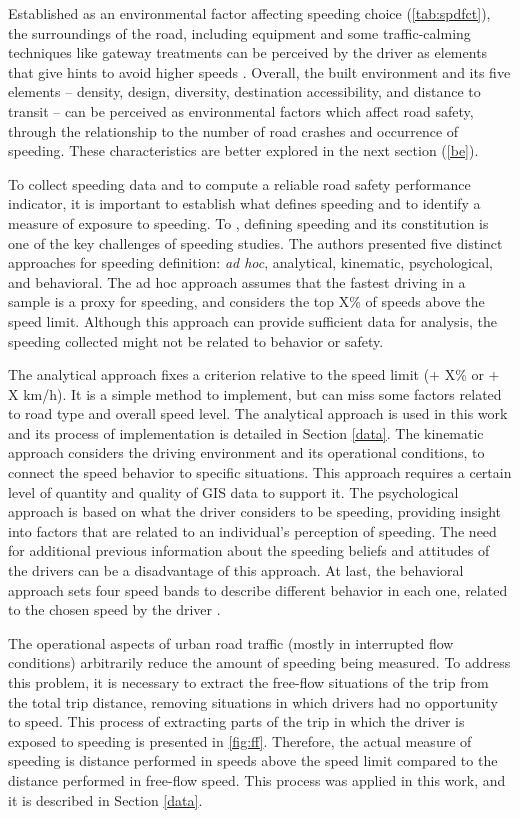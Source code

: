 Established as an environmental factor affecting speeding choice (\autoref{tab:spdfct}), the surroundings of the road, including equipment and some traffic-calming techniques like gateway treatments can be perceived by the driver as elements that give hints to avoid higher speeds \cite{WHO2008}. Overall, the built environment and its five elements – density, design, diversity, destination accessibility, and distance to transit – can be perceived as environmental factors which affect road safety, through the relationship to the number of road crashes and occurrence of speeding. These characteristics are better explored in the next section (\ref{be}). 

To collect speeding data and to compute a reliable road safety performance indicator, it is important to establish what defines speeding and to identify a measure of exposure to speeding. To \textcite{Richard2013}, defining speeding and its constitution is one of the key challenges of speeding studies. The authors presented five distinct approaches for speeding definition: \textit{ad hoc}, analytical, kinematic, psychological, and behavioral. The ad hoc approach assumes that the fastest driving in a sample is a proxy for speeding, and considers the top X\% of speeds above the speed limit. Although this approach can provide sufficient data for analysis, the speeding collected might not be related to behavior or safety. 

The analytical approach fixes a criterion relative to the speed limit (+ X\% or + X km/h). It is a simple method to implement, but can miss some factors related to road type and overall speed level. The analytical approach is used in this work and its process of implementation is detailed in Section \ref{data}. The kinematic approach considers the driving environment and its operational conditions, to connect the speed behavior to specific situations. This approach requires a certain level of quantity and quality of GIS data to support it. The psychological approach is based on what the driver considers to be speeding, providing insight into factors that are related to an individual's perception of speeding. The need for additional previous information about the speeding beliefs and attitudes of the drivers can be a disadvantage of this approach. At last, the behavioral approach sets four speed bands to describe different behavior in each one, related to the chosen speed by the driver \cite{Richard2013}.

The operational aspects of urban road traffic (mostly in interrupted flow conditions) arbitrarily reduce the amount of speeding being measured. To address this problem, it is necessary to extract the free-flow situations of the trip from the total trip distance, removing situations in which drivers had no opportunity to speed. This process of extracting parts of the trip in which the driver is exposed to speeding is presented in \autoref{fig:ff}. Therefore, the actual measure of speeding is distance performed in speeds above the speed limit compared to the distance performed in free-flow speed. This process was applied in this work, and it is described in Section \ref{data}. 

